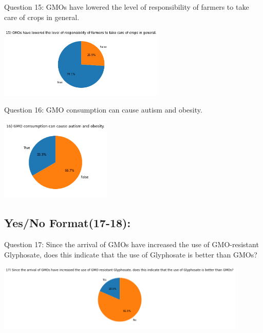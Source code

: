 \documentclass[11pt]{article}
\begin{document}
    \item{Question 15: GMOs have lowered the level of responsibility of farmers to take care of crops in general.}
    \begin{center}
        \includegraphics[width=300]{ChanR EDA/q15}
    \end{center}

    \item{Question 16: GMO consumption can cause autism and obesity.}
    \begin{center}
        \includegraphics[width=200]{ChanR EDA/q16}
    \end{center}

    \subsection{Yes/No Format(17-18):}
    \item{Question 17: Since the arrival of GMOs have increased the use of GMO-resistant Glyphosate, does this indicate that the use of Glyphosate is better than GMOs?}
    \begin{center}
        \includegraphics[width=450]{ChanR EDA/q17}
    \end{center}
\end{document}
